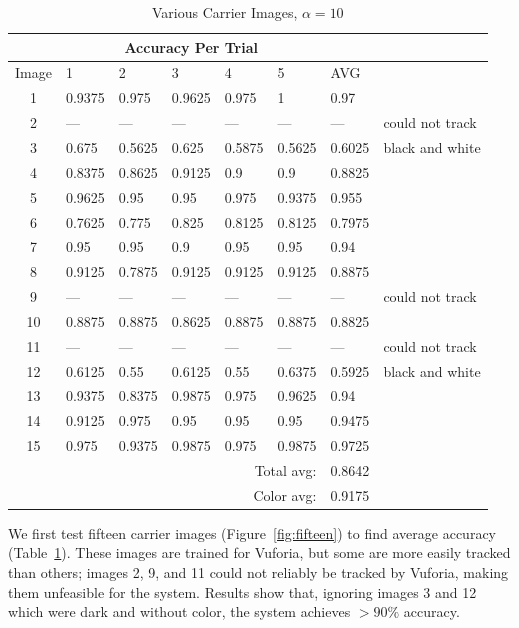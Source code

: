 \documentclass[11pt, letterpaper]{article}
\begin{document}
\begin{table}[t]
\caption{Various Carrier Images, $\alpha=10$}
\label{tab:images}
\centering
\begin{tabular}{c | l l l l l l l}
\\
&\multicolumn{5}{c}{Accuracy Per Trial}&\\ 
\toprule
Image&1&2&3&4&5&AVG\\ 
\midrule
1&0.9375&0.975&0.9625&0.975&1&0.97\\ 
2&---&---&---&---&---&---&could not track\\ 
3&0.675&0.5625&0.625&0.5875&0.5625&0.6025&black and white\\ 
4&0.8375&0.8625&0.9125&0.9&0.9&0.8825\\ 
5&0.9625&0.95&0.95&0.975&0.9375&0.955\\ 
6&0.7625&0.775&0.825&0.8125&0.8125&0.7975\\ 
7&0.95&0.95&0.9&0.95&0.95&0.94\\ 
8&0.9125&0.7875&0.9125&0.9125&0.9125&0.8875\\ 
9&---&---&---&---&---&---&could not track\\ 
10&0.8875&0.8875&0.8625&0.8875&0.8875&0.8825\\ 
11&---&---&---&---&---&---&could not track\\ 
12&0.6125&0.55&0.6125&0.55&0.6375&0.5925&black and white\\ 
13&0.9375&0.8375&0.9875&0.975&0.9625&0.94\\ 
14&0.9125&0.975&0.95&0.95&0.95&0.9475\\ 
15&0.975&0.9375&0.9875&0.975&0.9875&0.9725\\ 
\bottomrule
&&&&\multicolumn{2}{r}{Total avg:}&0.8642\\
&&&&\multicolumn{2}{r}{Color avg:}&0.9175\\ 
\end{tabular} 
\end{table}

We first test fifteen carrier images (Figure~\ref{fig:fifteen}) to find average accuracy (Table~\ref{tab:images}). These images are trained for Vuforia, but some are more easily tracked than others; images 2, 9, and 11 could not reliably be tracked by Vuforia, making them unfeasible for the system.
Results show that, ignoring images 3 and 12 which were dark and without color, the system achieves $ >90 \% $ accuracy.
\end{document}

